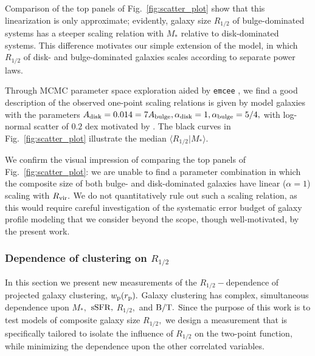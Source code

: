 \documentclass[usenatbib,usegraphicx,letterpaper]{mn2e}
\newcommand{\rhalf}{R_{1/2}}
\newcommand{\adisk}{A_{\rm disk}}
\newcommand{\abulge}{A_{\rm bulge}}
\newcommand{\alphadisk}{\alpha_{\rm disk}}
\newcommand{\alphabulge}{\alpha_{\rm bulge}}
\newcommand{\bt}{{\rm B/T}}
\newcommand{\mstar}{M_{\ast}}
\newcommand{\ssfr}{{\rm sSFR}}
\newcommand{\rvir}{R_{\rm vir}}
\newcommand{\rproj}{r_{\rm p}}
\newcommand{\wproj}{w_{\rm p}}
\begin{document}
Comparison of the top panels of Fig.~\ref{fig:scatter_plot} show that this linearization is only approximate; evidently, galaxy size $\rhalf$ of bulge-dominated systems has a steeper scaling relation with $\mstar$ relative to disk-dominated systems. This difference motivates our simple extension of the \citet{kravtsov13} model, in which $\rhalf$ of disk- and bulge-dominated galaxies scales according to separate power laws.

Through MCMC parameter space exploration aided by {\tt emcee} \citep{emcee_hammer}, we find a good description of the observed one-point scaling relations is given by model galaxies with the parameters $\adisk=0.014=7\abulge, \alphadisk=1, \alphabulge=5/4,$ with log-normal scatter of $0.2$ dex motivated by \citet{somerville_etal17}. The black curves in Fig.~\ref{fig:scatter_plot} illustrate the median $\langle\rhalf\vert\mstar\rangle.$

We confirm the visual impression of comparing the top panels of Fig.~\ref{fig:scatter_plot}: we are unable to find a parameter combination in which the composite size of both bulge- and disk-dominated galaxies have linear ($\alpha=1$) scaling with $\rvir.$ We do not quantitatively rule out such a scaling relation, as this would require careful investigation of the systematic error budget of galaxy profile modeling that we consider beyond the scope, though well-motivated, by the present work.

\subsubsection{Dependence of clustering on $\rhalf$}
\label{subsubsec:clustering_tests}

In this section we present new measurements of the $\rhalf-$dependence of projected galaxy clustering, $\wproj(\rproj).$ Galaxy clustering has complex, simultaneous dependence upon $\mstar,$ $\ssfr,$ $\rhalf,$ and $\bt.$ Since the purpose of this work is to test models of composite galaxy size $\rhalf,$ we design a measurement that is specifically tailored to isolate the influence of $\rhalf$ on the two-point function, while minimizing the dependence upon the other correlated variables.
\end{document}
